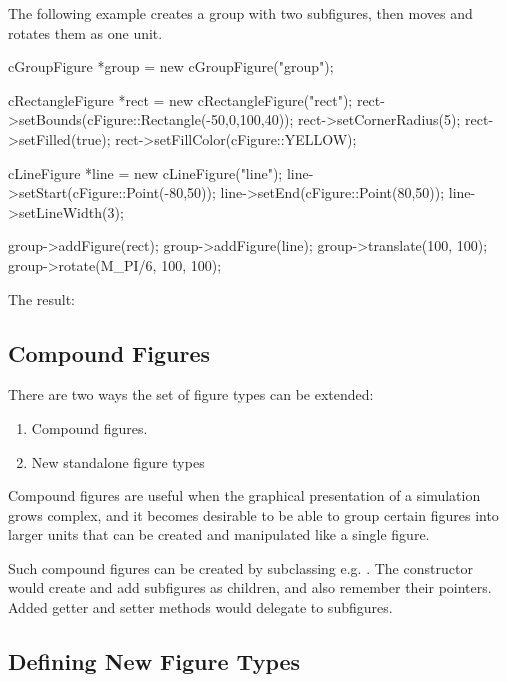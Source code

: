The following example creates a group with two subfigures, then moves and
rotates them as one unit.

\begin{cpp}
cGroupFigure *group = new cGroupFigure("group");

cRectangleFigure *rect = new cRectangleFigure("rect");
rect->setBounds(cFigure::Rectangle(-50,0,100,40));
rect->setCornerRadius(5);
rect->setFilled(true);
rect->setFillColor(cFigure::YELLOW);

cLineFigure *line = new cLineFigure("line");
line->setStart(cFigure::Point(-80,50));
line->setEnd(cFigure::Point(80,50));
line->setLineWidth(3);

group->addFigure(rect);
group->addFigure(line);
group->translate(100, 100);
group->rotate(M_PI/6, 100, 100);
\end{cpp}


The result:

\begin{center}

\end{center}


\subsection{Compound Figures}
\label{sec:graphics:compound-figures}

There are two ways the set of figure types can be extended:

\begin{enumerate}
  \item Compound figures.
  \item New standalone figure types
\end{enumerate}

Compound figures are useful when the graphical presentation of a simulation
grows complex, and it becomes desirable to be able to group certain figures
into larger units that can be created and manipulated like a single figure.

Such compound figures can be created by subclassing e.g. .
The constructor would create and add subfigures as children, and also remember
their pointers. Added getter and setter methods would delegate to subfigures.


\subsection{Defining New Figure Types}
\label{sec:graphics:defining-new-figure-types}


